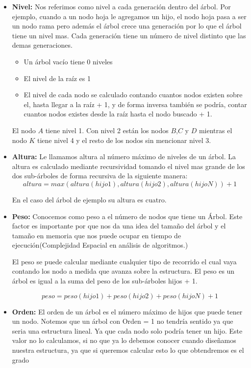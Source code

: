 \begin{itemize}
	\item \textbf{Nivel:} Nos referimos como nivel a cada generación dentro del árbol. Por ejemplo, cuando a un nodo hoja le agregamos un hijo, el nodo hoja pasa a ser un nodo rama pero además el árbol crece una generación por lo que el árbol tiene un nivel mas. Cada generación tiene un número de nivel distinto que las demas generaciones.
	
	\begin{itemize}
		\item Un árbol vacío tiene 0 niveles
		\item El nivel de la raíz es 1
		\item El nivel de cada nodo se calculado contando cuantos nodos existen sobre el, hasta llegar a la raíz + 1, y de forma inversa también se podría, contar cuantos nodos existes desde la raíz hasta el nodo buscado + 1.
	\end{itemize}

	El nodo $A$ tiene nivel 1. Con nivel 2 están los nodos $B$,$C$ y $D$ mientras el nodo $K$ tiene nivel 4 y el resto de los nodos sin mencionar nivel 3.

	\item \textbf{Altura:} Le llamamos altura al número máximo de niveles de un árbol. La altura es calculado mediante recursividad tomando el nivel mas grande de los dos sub-árboles de forma recursiva de la siguiente manera:
	$$ altura = max(altura(hijo1), altura(hijo2),altura(hijoN)) + 1 $$
	
	En el caso del árbol de ejemplo su altura es cuatro.
	
	\item \textbf{Peso:} Conocemos como peso a el número de nodos que tiene un Árbol. Este factor es importante por que nos da una idea del tamaño del árbol y el tamaño en memoria que nos puede ocupar en tiempo de ejecución(Complejidad Espacial en análisis de algoritmos.)
	
	El peso se puede calcular mediante cualquier tipo de recorrido el cual vaya contando los nodo a medida que avanza sobre la estructura. El peso es un árbol es igual a la suma del peso de los sub-árboles hijos + 1.
	
	$$ peso = peso(hijo1) + peso(hijo2) + peso(hijoN)+ 1 $$
	
	\item \textbf{Orden:} El orden de un árbol es el número máximo de hijos que puede tener un nodo. Notemos que un árbol con Orden = 1 no tendría sentido ya que seria una estructura lineal. Ya que cada nodo solo podría tener un hijo. Este valor no lo calculamos, si no que ya lo debemos conocer cuando diseñamos nuestra estructura, ya que si queremos calcular esto lo que obtendremos es el grado
	

\end{itemize}
